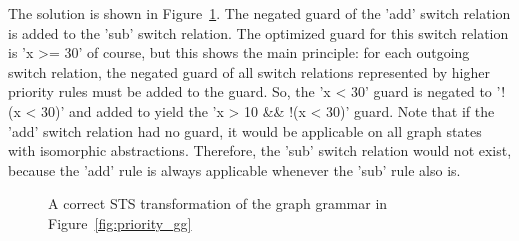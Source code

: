 The solution is shown in Figure~\ref{fig:priority_sts_right}. The negated guard of the 'add' switch relation is added to the 'sub' switch relation. The optimized guard for this switch relation is 'x >= 30' of course, but this shows the main principle: for each outgoing switch relation, the negated guard of all switch relations represented by higher priority rules must be added to the guard. So, the 'x < 30' guard is negated to '!(x < 30)' and added to yield the 'x > 10 \&\& !(x < 30)' guard. Note that if the 'add' switch relation had no guard, it would be applicable on all graph states with isomorphic abstractions. Therefore, the 'sub' switch relation would not exist, because the 'add' rule is always applicable whenever the 'sub' rule also is.

\begin{figure}[ht]
  \begin{center}
    
  \end{center}
  \caption{A correct STS transformation of the graph grammar in Figure~\ref{fig:priority_gg}}
  \label{fig:priority_sts_right}
\end{figure}
